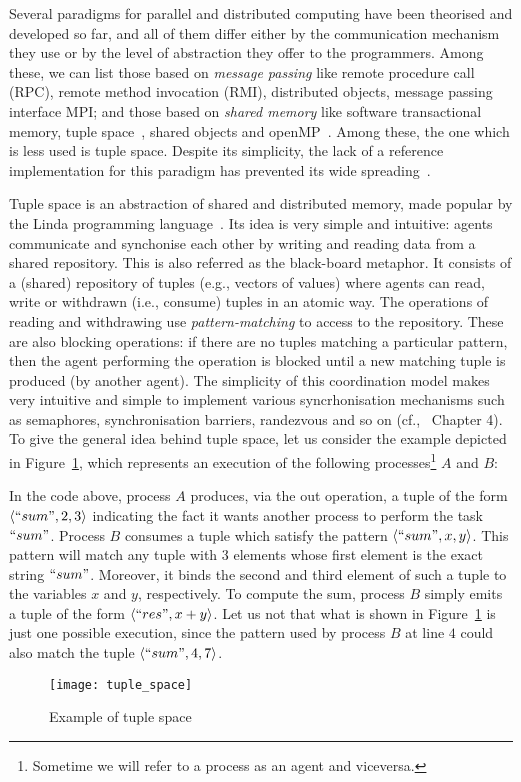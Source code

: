 
Several paradigms for parallel and distributed computing have been theorised and developed so far, and all of them differ either by the communication mechanism they use or by the level of abstraction they offer to the programmers. Among these, we can list those based on \emph{message passing} like remote procedure call (RPC), remote method invocation (RMI), distributed objects, message passing interface MPI; and those based on \emph{shared memory} like software transactional memory, tuple space~\cite{Gelernter85}, shared objects and  openMP~\cite{Mattson03}. Among these, the one which is less used is tuple space. Despite its simplicity, the lack of a reference implementation for this paradigm has prevented its wide spreading~\cite{BuravlevNM18}.


Tuple space is an abstraction of shared and distributed memory, made popular by the Linda programming language~\cite{Gelernter85}. Its idea is very simple and intuitive: agents communicate and synchonise each other by writing and reading data from a shared repository. This is also referred as the black-board metaphor. 
It consists of a (shared) repository of tuples (e.g., vectors of values) where agents can read, write or withdrawn (i.e., consume) tuples in an atomic way. 
The operations of reading and withdrawing use  \emph{pattern-matching} to access to the repository.
 These are also blocking operations:  if there are no tuples matching a particular pattern, then the agent performing the operation is blocked until a new matching tuple is produced (by another agent). The simplicity of this coordination model makes very intuitive and simple to implement various syncrhonisation mechanisms such as semaphores, synchronisation barriers, randezvous and so on (cf.,~\cite{Doberkat00b} Chapter 4). To give the general idea behind tuple space, let us consider the example depicted in Figure~\ref{fig:example}, which represents an execution of the following processes\footnote{Sometime we will refer to a process as an agent and viceversa.} $A$ and $B$: 
 
 \noindent In the code above, process $A$ produces, via the out operation, a tuple of the form $\langle ``sum",2,3 \rangle$ indicating the fact it wants
 another process to perform the task $``sum"$. Process $B$ consumes a tuple which satisfy the pattern $\langle ``sum",x,y \rangle$. This pattern will match any tuple with 3 elements 
  whose first element is the exact string
 $``sum"$. Moreover, it  binds the second and third element of such a tuple to the variables $x$ and $y$, respectively. To compute the sum, process $B$ simply emits a tuple of the form $\langle ``res",x+y \rangle$. Let us not that what is shown in Figure~\ref{fig:example} is just one possible execution, since the pattern used by process $B$ at line
 $4$ could also match the tuple $\langle ``sum",4,7 \rangle$.
 
 \begin{figure}
\centering
 	\texttt{[image: tuple\_space]}
	\label{fig:example}
	\caption{Example of tuple space}
 \end{figure}